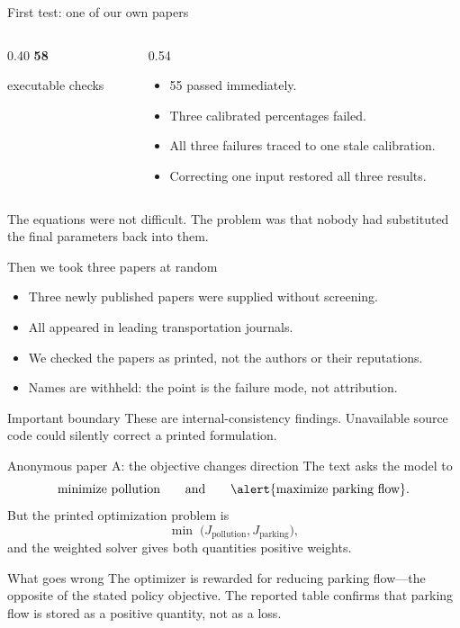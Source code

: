 \documentclass[aspectratio=169,11pt]{beamer}
\begin{document}
\begin{frame}{First test: one of our own papers}
  \begin{columns}[T]
    \begin{column}{0.40\textwidth}
      \centering
      {\fontsize{34}{38}\selectfont\bfseries 58}\par
      executable checks
    \end{column}
    \begin{column}{0.54\textwidth}
      \begin{itemize}\itemsep0.7em
        \item 55 passed immediately.
        \item Three calibrated percentages failed.
        \item All three failures traced to one stale calibration.
        \item Correcting one input restored all three results.
      \end{itemize}
    \end{column}
  \end{columns}
  \vfill
  \begin{block}{}
    The equations were not difficult. The problem was that nobody had substituted the final parameters back into them.
  \end{block}
\end{frame}

\begin{frame}{Then we took three papers at random}
  \begin{itemize}\itemsep0.7em
    \item Three newly published papers were supplied without screening.
    \item All appeared in leading transportation journals.
    \item We checked the papers as printed, not the authors or their reputations.
    \item Names are withheld: the point is the failure mode, not attribution.
  \end{itemize}
  \vfill
  \begin{block}{Important boundary}
    These are internal-consistency findings. Unavailable source code could silently correct a printed formulation.
  \end{block}
\end{frame}

\begin{frame}{Anonymous paper A: the objective changes direction}
  The text asks the model to
  \[
    \text{minimize pollution}\qquad\text{and}\qquad\alert{\text{maximize parking flow}}.
  \]
  But the printed optimization problem is
  \[
    \min\;\bigl(J_{\mathrm{pollution}},J_{\mathrm{parking}}\bigr),
  \]
  and the weighted solver gives both quantities positive weights.
  \vfill
  \begin{block}{What goes wrong}
    The optimizer is rewarded for reducing parking flow---the opposite of the stated policy objective. The reported table confirms that parking flow is stored as a positive quantity, not as a loss.
  \end{block}
\end{frame}
\end{document}
